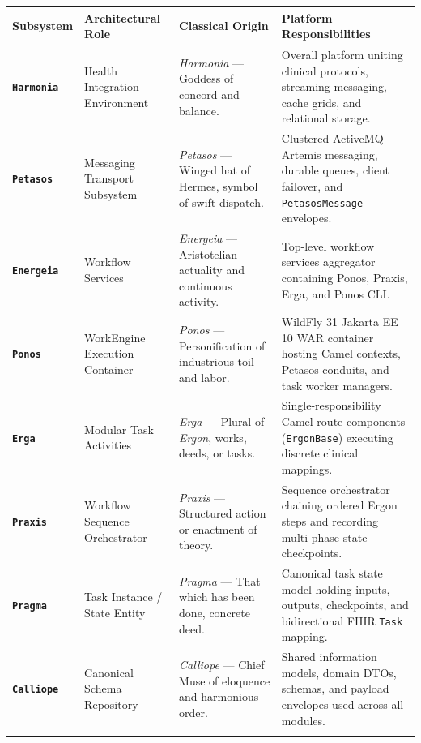 \begin{table}[htbp]
\centering
\small
\begin{tabularx}{\textwidth}{l p{3.2cm} p{3.5cm} X}
\toprule
\textbf{Subsystem} & \textbf{Architectural Role} & \textbf{Classical Origin} & \textbf{Platform Responsibilities} \\
\midrule
\textbf{\texttt{Harmonia}} & Health Integration Environment & \textit{Harmonia} --- Goddess of concord and balance. & Overall platform uniting clinical protocols, streaming messaging, cache grids, and relational storage. \\
\addlinespace
\textbf{\texttt{Petasos}} & Messaging Transport Subsystem & \textit{Petasos} --- Winged hat of Hermes, symbol of swift dispatch. & Clustered ActiveMQ Artemis messaging, durable queues, client failover, and \texttt{PetasosMessage} envelopes. \\
\addlinespace
\textbf{\texttt{Energeia}} & Workflow Services & \textit{Energeia} --- Aristotelian actuality and continuous activity. & Top-level workflow services aggregator containing Ponos, Praxis, Erga, and Ponos CLI. \\
\addlinespace
\textbf{\texttt{Ponos}} & WorkEngine Execution Container & \textit{Ponos} --- Personification of industrious toil and labor. & WildFly 31 Jakarta EE 10 WAR container hosting Camel contexts, Petasos conduits, and task worker managers. \\
\addlinespace
\textbf{\texttt{Erga}} & Modular Task Activities & \textit{Erga} --- Plural of \textit{Ergon}, works, deeds, or tasks. & Single-responsibility Camel route components (\texttt{ErgonBase}) executing discrete clinical mappings. \\
\addlinespace
\textbf{\texttt{Praxis}} & Workflow Sequence Orchestrator & \textit{Praxis} --- Structured action or enactment of theory. & Sequence orchestrator chaining ordered Ergon steps and recording multi-phase state checkpoints. \\
\addlinespace
\textbf{\texttt{Pragma}} & Task Instance / State Entity & \textit{Pragma} --- That which has been done, concrete deed. & Canonical task state model holding inputs, outputs, checkpoints, and bidirectional FHIR \texttt{Task} mapping. \\
\addlinespace
\textbf{\texttt{Calliope}} & Canonical Schema Repository & \textit{Calliope} --- Chief Muse of eloquence and harmonious order. & Shared information models, domain DTOs, schemas, and payload envelopes used across all modules. \\
\addlinespace

\end{tabularx}
\end{table}
